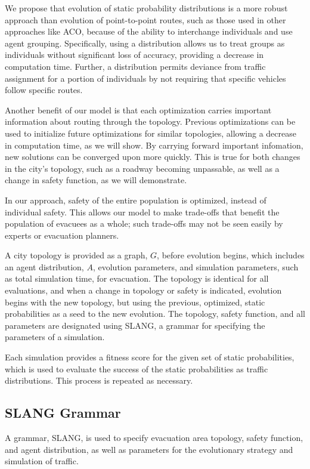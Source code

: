 \documentclass{sig-alternate-05-2015}
\begin{document}
	We propose that evolution of static probability distributions is a more robust approach than evolution of point-to-point routes, such as those used in other approaches like ACO, because of the ability to interchange individuals and use agent grouping. Specifically, using a distribution allows us to treat groups as individuals without significant loss of accuracy, providing a decrease in computation time. Further, a distribution permits deviance from traffic assignment for a portion of individuals by not requiring that specific vehicles follow specific routes.
	
	Another benefit of our model is that each optimization carries important information about routing through the topology. Previous optimizations can be used to initialize future optimizations for similar topologies, allowing a decrease in computation time, as we will show. By carrying forward important infomation, new solutions can be converged upon more quickly. This is true for both changes in the city's topology, such as a roadway becoming unpassable, as well as a change in safety function, as we will demonstrate.
	
	In our approach, safety of the entire population is optimized, instead of individual safety. This allows our model to make trade-offs that benefit the population of evacuees as a whole; such trade-offs may not be seen easily by experts or evacuation planners. 
	
	A city topology is provided as a graph, $G$, before evolution begins, which includes an agent distribution, $A$, evolution parameters, and simulation parameters, such as total simulation time, for evacuation. The topology is identical for all evaluations, and when a change in topology or safety is indicated, evolution begins with the new topology, but using the previous, optimized, static probabilities as a seed to the new evolution. The topology, safety function, and all parameters are designated using SLANG, a grammar for specifying the parameters of a simulation.
	
	Each simulation provides a fitness score for the given set of static probabilities, which is used to evaluate the success of the static probabilities as traffic distributions. This process is repeated as necessary.
	
		\subsection{SLANG Grammar}
			A grammar, SLANG, is used to specify evacuation area topology, safety function, and agent distribution, as well as parameters for the evolutionary strategy and simulation of traffic. 
			
\end{document}
